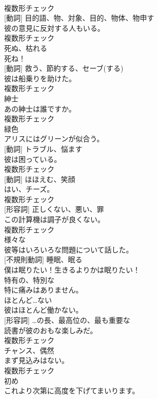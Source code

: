 \documentclass[8pt]{extreport}
\begin{document}
\begin{CJK}{UTF8}{min}
\\	複数形チェック
\\	[名詞] [動詞]	目的語、物、対象、目的、物体、物申す	
\\	彼の意見に反対する人もいる。	
\\	複数形チェック
\\	[動詞]	死ぬ、枯れる	
\\	死ね！	
\\	[名詞] [動詞]	救う、節約する、セーブ(する)	
\\	彼は船乗りを助けた。	
\\	複数形チェック
\\	[名詞]	紳士	
\\	あの紳士は誰ですか。	
\\	複数形チェック
\\	[形容詞]	緑色	
\\	アリスにはグリーンが似合う。	
\\	[名詞] [動詞]	トラブル、悩ます	
\\	彼は困っている。	
\\	複数形チェック
\\	[名詞] [動詞]	ほほえむ、笑顔	
\\	はい、チーズ。	
\\	複数形チェック
\\	[名詞] [形容詞]	正しくない、悪い、罪	
\\	この計算機は調子が良くない。	
\\	複数形チェック
\\	[形容詞]	様々な	
\\	彼等はいろいろな問題について話した。	
\\	[動詞] [不規則動詞]	睡眠、眠る	
\\	僕は眠りたい！生きるよりかは眠りたい！	
\\	[形容詞]	特有の、特別な	
\\	特に痛みはありません。	
\\	[副詞]	ほとんど…ない	
\\	彼はほとんど働かない。	
\\	[名詞] [形容詞]	…の長、最高位の、最も重要な	
\\	読書が彼のおもな楽しみだ。	
\\	複数形チェック
\\	[名詞]	チャンス、偶然	
\\	まず見込みはない。	
\\	複数形チェック
\\	[名詞]	初め	
\\	これより次第に高度を下げてまいります。	

\end{CJK}
\end{document}
